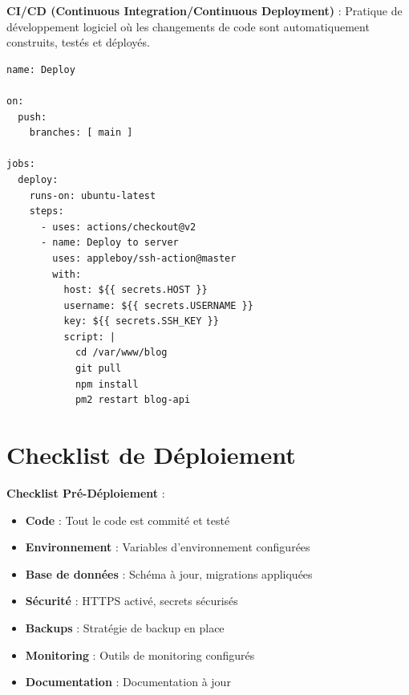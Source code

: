 \begin{definitionbox}
    \textbf{CI/CD (Continuous Integration/Continuous Deployment)} : Pratique de développement logiciel où les changements de code sont automatiquement construits, testés et déployés.
\end{definitionbox}

\begin{lstlisting}[style=yaml, caption=Exemple de workflow GitHub Actions]
name: Deploy

on:
  push:
    branches: [ main ]

jobs:
  deploy:
    runs-on: ubuntu-latest
    steps:
      - uses: actions/checkout@v2
      - name: Deploy to server
        uses: appleboy/ssh-action@master
        with:
          host: ${{ secrets.HOST }}
          username: ${{ secrets.USERNAME }}
          key: ${{ secrets.SSH_KEY }}
          script: |
            cd /var/www/blog
            git pull
            npm install
            pm2 restart blog-api
\end{lstlisting}

\section{Checklist de Déploiement}

\begin{bestpracticebox}
    \textbf{Checklist Pré-Déploiement} :
    \begin{itemize}
        \item \textbf{Code} : Tout le code est commité et testé
        \item \textbf{Environnement} : Variables d'environnement configurées
        \item \textbf{Base de données} : Schéma à jour, migrations appliquées
        \item \textbf{Sécurité} : HTTPS activé, secrets sécurisés
        \item \textbf{Backups} : Stratégie de backup en place
        \item \textbf{Monitoring} : Outils de monitoring configurés
        \item \textbf{Documentation} : Documentation à jour
    \end{itemize}
\end{bestpracticebox}

